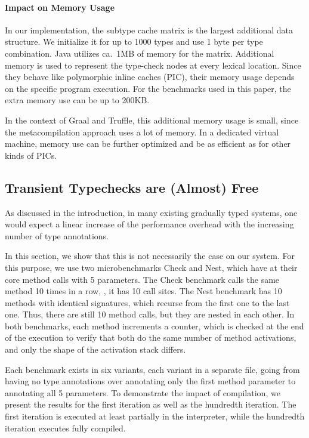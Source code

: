 \paragraph*{Impact on Memory Usage}

In our implementation, the subtype cache matrix is the largest additional
data structure.
We initialize it for up to 1000 types and use 1 byte per type combination.
Java utilizes ca.\ 1MB of memory for the matrix.
Additional memory is used to represent the type-check nodes at every lexical location.
Since they behave like polymorphic inline caches (PIC)\citep{Hoelzle:91:PIC},
their memory usage depends on the specific program execution.
For the benchmarks used in this paper, the extra memory use can be up to 200KB.

In the context of Graal and Truffle, this additional memory usage is small,
since the metacompilation approach uses a lot of memory\citep{Marr:2015:MTPE}.
In a dedicated virtual machine,
memory use can be further optimized and be as efficient as for other kinds of PICs.


\subsection{Transient Typechecks are (Almost) Free}

As discussed in the introduction, in many existing gradually typed systems,
one would expect a linear increase of the performance overhead
with the increasing number of type annotations.

In this section, we show that this is not necessarily the case on our system.
For this purpose, we use two microbenchmarks Check and Nest,
which have at their core method calls with 5 parameters.
The Check benchmark calls the same method 10 times in a row, \ie, it has 10 call sites.
The Nest benchmark has 10 methods with identical signatures,
which recurse from the first one to the last one.
Thus, there are still 10 method calls, but they are nested in each other.
In both benchmarks, each method increments a counter,
which is checked at the end of the execution to verify that both do the same
number of method activations, and only the shape of the activation stack differs.

Each benchmark exists in six variants, each variant in a separate file,
going from having no type annotations
over annotating only the first method parameter to annotating all 5 parameters.
To demonstrate the impact of compilation,
we present the results for the first iteration as well as the hundredth iteration.
The first iteration is executed at least partially in the interpreter,
while the hundredth iteration executes fully compiled.

